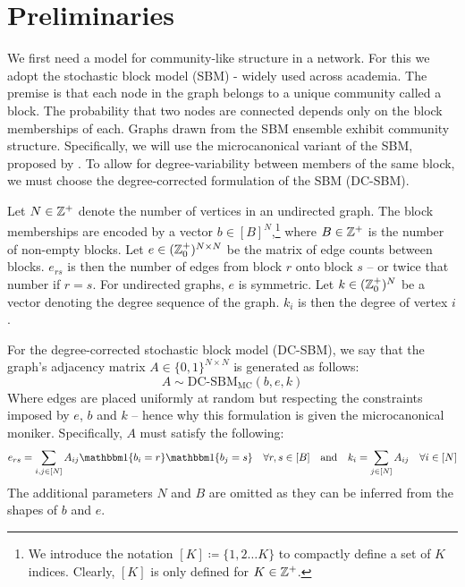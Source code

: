 \section{Preliminaries}

We first need a model for community-like structure in a network. For this we adopt the stochastic block model (SBM) - widely used across academia. The premise is that each node in the graph belongs to a unique community called a block. The probability that two nodes are connected depends only on the block memberships of each. Graphs drawn from the SBM ensemble exhibit community structure. Specifically, we will use the microcanonical variant of the SBM, proposed by \citet{Peixoto-Bayesian-Microcanonical}. To allow for degree-variability between members of the same block, we must choose the degree-corrected formulation of the SBM (DC-SBM).

\begin{definition}
	\label{defn:microcan-dc-sbm}
	Let $N \in \mathbb{Z}^{+}$ denote the number of vertices in an undirected graph. The block memberships are encoded by a vector $b \in [B]^N$,\footnote{We introduce the notation $[K] \coloneqq \{1, 2 \dots K\}$ to compactly define a set of $K$ indices. Clearly, $[K]$ is only defined for $K \in \mathbb{Z}^+$.}
	where $B \in \mathbb{Z}^{+}$ is the number of non-empty blocks.
	Let $e \in (\mathbb{Z}_0^+)^{N \times N}$ be the matrix of edge counts between blocks. $e_{rs}$ is then the number of edges from block $r$ onto block $s$ -- or twice that number if $r=s$. For undirected graphs, $e$ is symmetric.
	Let $k \in (\mathbb{Z}^+_0)^N$ be a vector denoting the degree sequence of the graph. $k_i$ is then the degree of vertex $i$.
	
	For the degree-corrected stochastic block model (DC-SBM), we say that the graph's adjacency matrix $A \in \{0,1\}^{N \times N}$ is generated as follows:
	\begin{equation}
		A \sim \textrm{DC-SBM}_{\textrm{MC}} (b, e, k)
	\end{equation}
	Where edges are placed uniformly at random but respecting the constraints imposed by $e$, $b$ and $k$ -- hence why this formulation is given the microcanonical moniker. Specifically, $A$ must satisfy the following:
	\begin{equation}
		e_{rs} = \sum_{i, j \in [N]} A_{ij} \one \{b_i = r\} \one \{b_j = s\} \quad \forall r,s \in [B]
		\quad \textrm{and} \quad
		k_i = \sum_{j \in [N]} A_{ij} \quad \forall i \in [N]
		\label{eqn:sbm-constraints}
	\end{equation}
	The additional parameters $N$ and $B$ are omitted as they can be inferred from the shapes of $b$ and $e$.
\end{definition}